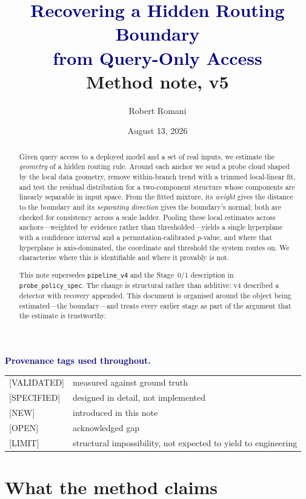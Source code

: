 \documentclass[11pt]{article}
\title{\textcolor{navy}{\sffamily Recovering a Hidden Routing Boundary\\[2pt]
from Query-Only Access}\\[6pt]
\large\normalfont Method note, v5}
\author{Robert Romani}
\date{August 13, 2026}
\newcommand{\provtag}[2]{{\footnotesize\sffamily\textcolor{#1}{[#2]}}}
\newcommand{\VALID}{\provtag{okgreen}{VALIDATED}}
\newcommand{\SPEC}{\provtag{specblue}{SPECIFIED}}
\newcommand{\NEWT}{\provtag{newmag}{NEW}}
\newcommand{\OPENT}{\provtag{openamber}{OPEN}}
\newcommand{\LIMIT}{\provtag{limred}{LIMIT}}
\begin{document}
\maketitle

\begin{abstract}
\noindent Given query access to a deployed model and a set of real inputs, we estimate the
\emph{geometry} of a hidden routing rule. Around each anchor we send a probe cloud shaped by
the local data geometry, remove within-branch trend with a trimmed local-linear fit, and test
the residual distribution for a two-component structure whose components are linearly separable
in input space. From the fitted mixture, its \emph{weight} gives the distance to the boundary and
its \emph{separating direction} gives the boundary's normal; both are checked for consistency
across a scale ladder. Pooling these local estimates across anchors---weighted by evidence
rather than thresholded---yields a single hyperplane with a confidence interval and a
permutation-calibrated $p$-value, and where that hyperplane is axis-dominated, the coordinate
and threshold the system routes on. We characterise where this is identifiable and where it
provably is not.

\medskip
\noindent\textcolor{muted}{\small This note supersedes \texttt{pipeline\_v4} and the Stage~0/1
description in \texttt{probe\_policy\_spec}. The change is structural rather than additive: v4
described a detector with recovery appended. This document is organised around the object being
estimated---the boundary---and treats every earlier stage as part of the argument that the
estimate is trustworthy.}
\end{abstract}

\noindent\textbf{\sffamily\small\textcolor{navy}{Provenance tags used throughout.}}
\smallskip

{\small
\begin{tabular}{@{}ll@{}}
\VALID & measured against ground truth\\
\SPEC & designed in detail, not implemented\\
\NEWT & introduced in this note\\
\OPENT & acknowledged gap\\
\LIMIT & structural impossibility, not expected to yield to engineering\\
\end{tabular}}

\vspace{0.5em}

\part{What the method claims}
\end{document}
